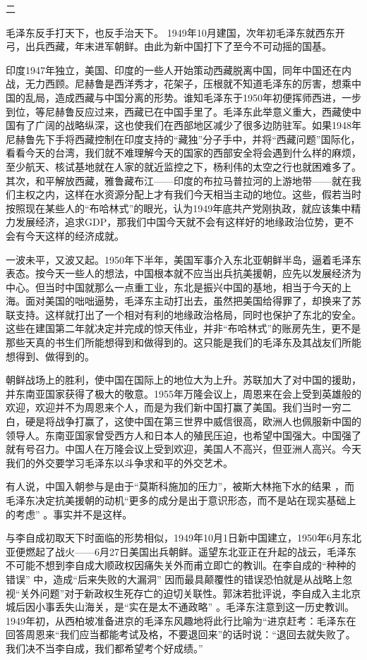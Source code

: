\documentclass[UTF8, 12pt, a4paper]{ctexrep}
\begin{document}
二

毛泽东反手打天下，也反手治天下。 1949年10月建国，次年初毛泽东就西东开弓，出兵西藏，年末进军朝鲜。由此为新中国打下了至今不可动摇的国基。

印度1947年独立，美国、印度的一些人开始策动西藏脱离中国，同年中国还在内战，无力西顾。尼赫鲁是西洋秀才，花架子，压根就不知道毛泽东的厉害，想乘中国的乱局，造成西藏与中国分离的形势。谁知毛泽东于1950年初便挥师西进，一步到位，等尼赫鲁反应过来，西藏已在中国手里了。毛泽东此举意义重大，西藏使中国有了广阔的战略纵深，这也使我们在西部地区减少了很多边防驻军。如果1948年尼赫鲁先下手将西藏控制在印度支持的“藏独”分子手中，并将“西藏问题”国际化，看看今天的台湾，我们就不难理解今天的国家的西部安全将会遇到什么样的麻烦，至少航天、核试基地就在人家的就近监控之下，杨利伟的太空之行也就困难多了。其次，和平解放西藏，雅鲁藏布江——印度的布拉马普拉河的上游地带——就在我们主权之内，这样在水资源分配上才有我们今天相当主动的地位。这些，假若当时按照现在某些人的“布哈林式”的眼光，认为1949年底共产党刚执政，就应该集中精力发展经济，追求GDP，那我们中国今天就不会有这样好的地缘政治位势，更不会有今天这样的经济成就。

一波未平，又波又起。1950年下半年，美国军事介入东北亚朝鲜半岛，逼着毛泽东表态。按今天一些人的想法，中国根本就不应当出兵抗美援朝，应先以发展经济为中心。但当时中国就那么一点重工业，东北是振兴中国的基地，相当于今天的上海。面对美国的咄咄逼势，毛泽东主动打出去，虽然把美国给得罪了，却换来了苏联支持。这样就打出了一个相对有利的地缘政治格局，同时也保护了东北的安全。这些在建国第二年就决定并完成的惊天伟业，并非“布哈林式”的账房先生，更不是那些天真的书生们所能想得到和做得到的。这只能是我们的毛泽东及其战友们所能想得到、做得到的。

朝鲜战场上的胜利，使中国在国际上的地位大为上升。苏联加大了对中国的援助，并东南亚国家获得了极大的敬意。1955年万隆会议上，周恩来在会上受到英雄般的欢迎，欢迎并不为周恩来个人，而是为我们新中国打赢了美国。我们当时一穷二白，硬是将战争打赢了，这使中国在第三世界中威信很高，欧洲人也佩服新中国的领导人。东南亚国家曾受西方人和日本人的殖民压迫，也希望中国强大。中国强了就有号召力。中国人在万隆会议上受到欢迎，美国人不高兴，但亚洲人高兴。今天我们的外交要学习毛泽东以斗争求和平的外交艺术。

有人说，中国入朝参与是由于“莫斯科施加的压力”，被斯大林拖下水的结果 ，而毛泽东决定抗美援朝的动机“更多的成分是出于意识形态，而不是站在现实基础上的考虑” 。事实并不是这样。

与李自成初取天下时面临的形势相似，1949年10月1日新中国建立，1950年6月东北亚便燃起了战火——6月27日美国出兵朝鲜。遥望东北亚正在升起的战云，毛泽东不可能不想到李自成大顺政权因痛失关外而甫立即亡的教训。在李自成的“种种的错误” 中，造成“后来失败的大漏洞” 因而最具颠覆性的错误恐怕就是从战略上忽视“关外问题”对于新政权生死存亡的迫切关联性。郭沫若批评说，李自成入主北京城后因小事丢失山海关，是“实在是太不通政略” 。毛泽东注意到这一历史教训。1949年初，从西柏坡准备进京的毛泽东风趣地将此行比喻为“进京赶考：毛泽东在回答周恩来“我们应当都能考试及格，不要退回来”的话时说：“退回去就失败了。我们决不当李自成，我们都希望考个好成绩。”
\end{document}
